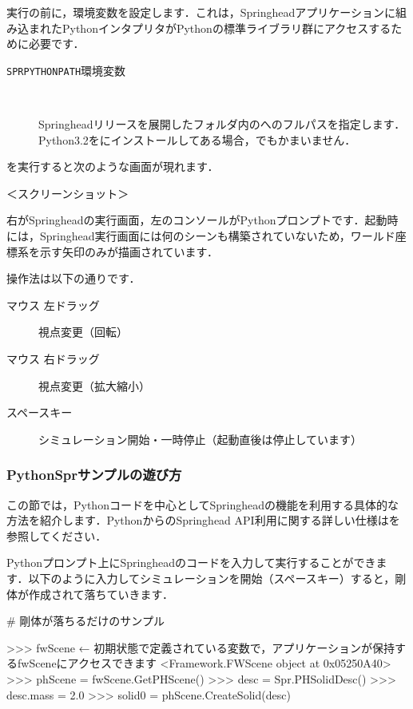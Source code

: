 \KLUDGE 実行の前に，環境変数を設定します．これは，Springhead\KLUDGE アプリケーションに組み込まれたPython\KLUDGE インタプリタがPython\KLUDGE の標準ライブラリ群にアクセスするために必要です．
\begin{description}
\item[\texttt{SPRPYTHONPATH}\KLUDGE 環境変数]~

Springhead\KLUDGE リリースを展開したフォルダ内の\KLUDGE へのフルパスを指定します．Python3.2\KLUDGE を\KLUDGE にインストールしてある場合，\KLUDGE でもかまいません．
\end{description}

\KLUDGE を実行すると次のような画面が現れます．

\KLUDGE ＜スクリーンショット＞

\KLUDGE 右がSpringhead\KLUDGE の実行画面，左のコンソールがPython\KLUDGE プロンプトです．起動時には，Springhead\KLUDGE 実行画面には何のシーンも構築されていないため，ワールド座標系を示す矢印のみが描画されています．

\KLUDGE 操作法は以下の通りです．
\begin{description}
\item[\KLUDGE マウス \KLUDGE 左ドラッグ] \KLUDGE 視点変更（回転）
\item[\KLUDGE マウス \KLUDGE 右ドラッグ] \KLUDGE 視点変更（拡大縮小）
\item[\KLUDGE スペースキー] \KLUDGE シミュレーション開始・一時停止（起動直後は停止しています）
\end{description}

\subsubsection*{PythonSpr\KLUDGE サンプルの遊び方}

\KLUDGE この節では，Python\KLUDGE コードを中心としてSpringhead\KLUDGE の機能を利用する具体的な方法を紹介します．Python\KLUDGE からのSpringhead API\KLUDGE 利用に関する詳しい仕様は\KLUDGE を参照してください．

Python\KLUDGE プロンプト上にSpringhead\KLUDGE のコードを入力して実行することができます．以下のように入力してシミュレーションを開始（スペースキー）すると，剛体が作成されて落ちていきます．
\begin{sourcecode}
# 剛体が落ちるだけのサンプル

>>> fwScene   ← 初期状態で定義されている変数で，アプリケーションが保持するfwSceneにアクセスできます
<Framework.FWScene object at 0x05250A40>
>>> phScene = fwScene.GetPHScene()
>>> desc = Spr.PHSolidDesc()
>>> desc.mass = 2.0
>>> solid0 = phScene.CreateSolid(desc)
\end{sourcecode}


